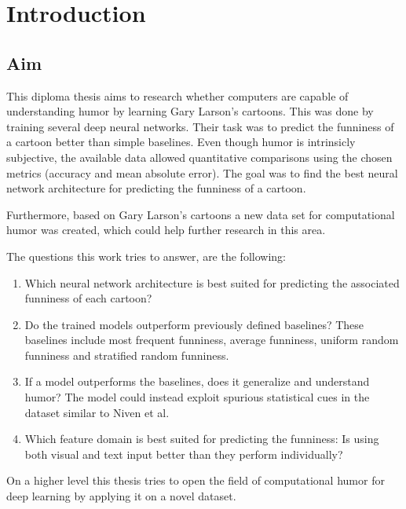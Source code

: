 \documentclass[draft,final,oneside]{vutinfth} %
\begin{document}
\chapter{Introduction}

\section{Aim} \label{aim}
This diploma thesis aims to research whether computers are capable of understanding humor by learning Gary Larson's cartoons. This was done by training several deep neural networks. Their task was to predict the funniness of a cartoon better than simple baselines. Even though humor is intrinsicly subjective, the available data allowed quantitative comparisons using the chosen metrics (accuracy and mean absolute error). The goal was to find the best neural network architecture for predicting the funniness of a cartoon.

Furthermore, based on Gary Larson's cartoons a new data set for computational humor was created, which could help further research in this area.

The questions this work tries to answer, are the following:

\begin{enumerate}

\item Which neural network architecture is best suited for predicting the associated funniness of each cartoon?

\item Do the trained models outperform previously defined baselines? These baselines include most frequent funniness, average funniness, uniform random funniness and stratified random funniness.

\item If a model outperforms the baselines, does it generalize and understand humor? The model could instead exploit spurious statistical cues in the dataset similar to Niven et al. \cite{cleverhans}

\item Which feature domain is best suited for predicting the funniness: Is using both visual and text input better than they perform individually?

\end{enumerate}

On a higher level this thesis tries to open the field of computational humor for deep learning by applying it on a novel dataset.
\end{document}
